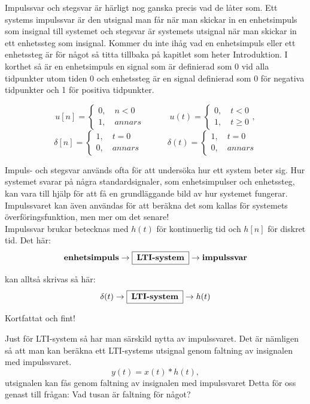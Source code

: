 \documentclass{article}
\begin{document}
Impulssvar och stegsvar är härligt nog ganska precis vad de låter som. Ett
systems impulssvar är den utsignal man får när man skickar in en enhetsimpuls
som insignal till systemet och stegsvar är systemets utsignal när man skickar
in ett enhetssteg som insignal. Kommer du inte ihåg vad en enhetsimpuls eller
ett enhetssteg är för något så titta tillbaka på kapitlet som heter
Introduktion. I korthet så är en enhetsimpuls en signal som är definierad som
0 vid alla tidpunkter utom tiden 0 och enhetssteg är en signal definierad som
0 för negativa tidpunkter och 1 för positiva tidpunkter.

$$
u[n] = \begin{cases}
    0, \quad n < 0 \\
    1, \quad annars
        \end{cases}
\quad \quad \quad
u(t) =
    \begin{cases}
    0, \quad t < 0 \\
    1, \quad t \geq 0
    \end{cases},
$$
$$
\delta[n] =
    \begin{cases}
    1, \quad t = 0 \\
    0, \quad annars
    \end{cases}
\quad \quad \quad
\delta(t) =
    \begin{cases}
    1, \quad t = 0 \\
    0, \quad annars
    \end{cases}
$$

Impuls- och stegsvar används ofta för att undersöka hur ett system beter sig.
Hur systemet svarar på några standardsignaler, som enhetsimpulser och
enhetssteg, kan vara till hjälp för att få en grundläggande bild av hur
systemet fungerar. Impulssvaret kan även användas för att beräkna det som
kallas för systemets överföringsfunktion, men mer om det senare! \\
\newline
Impulssvar brukar betecknas med $h(t)$ för kontinuerlig tid och $h[n]$ för diskret tid.
Det här:
$$\textbf{enhetsimpuls} \rightarrow \framebox[1.2\width]{\textbf{LTI-system}} \rightarrow \textbf{impulssvar} $$

kan alltså skrivas så här:
$$\delta (t) \rightarrow \framebox[1.2\width]{\textbf{LTI-system}} \rightarrow h(t) $$

Kortfattat och fint!
\newline

Just för LTI-system så har man särskild nytta av impulssvaret. Det är
nämligen så att man kan beräkna ett LTI-systems utsignal genom faltning av insignalen med impulssvaret.
$$ y(t)=x(t)*h(t),$$
utsignalen kan fås genom faltning av insignalen med impulssvaret
Detta för oss genast till frågan: Vad tusan är faltning för något?
\end{document}
